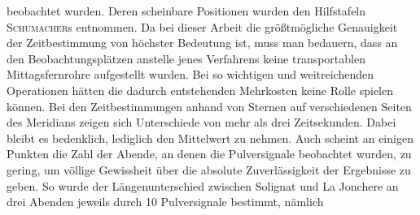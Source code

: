 beobachtet wurden. Deren scheinbare Positionen wurden den Hilfstafeln \textsc{Schumacher}s entnommen. Da bei dieser Arbeit die größtmögliche Genauigkeit der Zeitbestimmung von höchster Bedeutung ist, muss man bedauern, dass an den Beobachtungsplätzen anstelle jenes Verfahrens keine transportablen Mittagsfernrohre aufgestellt wurden. Bei so wichtigen und weitreichenden Operationen hätten die dadurch entstehenden Mehrkosten keine Rolle spielen können. Bei den Zeitbestimmungen anhand von Sternen auf verschiedenen Seiten des Meridians zeigen sich Unterschiede von mehr als drei Zeitsekunden. Dabei bleibt es bedenklich, lediglich den Mittelwert zu nehmen. Auch scheint an einigen Punkten die Zahl der Abende, an denen die Pulversignale beobachtet wurden, zu gering, um völlige Gewissheit über die absolute Zuverlässigkeit der Ergebnisse zu geben. So wurde der Längenunterschied zwischen Solignat und La Jonchere an drei Abenden jeweils durch 10 Pulversignale bestimmt, nämlich

